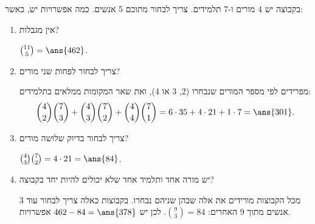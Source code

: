 בקבוצה יש 4 מורים ו-7 תלמידים. צריך לבחור מתוכם 5 אנשים. כמה אפשרויות יש, כאשר:
\begin{enumerate}
\item אין מגבלות?
\begin{solbox}
$\binom{11}5=\ans{462}$.
\end{solbox}
\item צריך לבחור לפחות שני מורים?
\begin{solbox}
מפרידים לפי מספר המורים שנבחרו (2, 3 או 4), ואת שאר המקומות ממלאים בתלמידים:
\[
\binom42\binom73+\binom43\binom72+\binom44\binom71=6\cdot35+4\cdot21+1\cdot7=\ans{301}.
\]
\end{solbox}
\item צריך לבחור בדיוק שלושה מורים?
\begin{solbox}
$\binom43\binom72=4\cdot21=\ans{84}$.
\end{solbox}
\item יש מורה אחד ותלמיד אחד שלא יכולים להיות יחד בקבוצה?
\begin{solbox}
מכל הקבוצות מורידים את אלה שבהן שניהם נבחרו. בקבוצות כאלה צריך לבחור עוד 3 אנשים מתוך 9 האחרים: $\binom93=84$. לכן יש $462-84=\ans{378}$ אפשרויות.
\end{solbox}
\end{enumerate}
